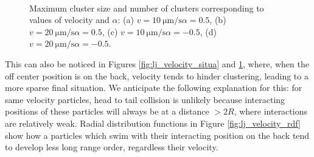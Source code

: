 \documentclass[../../master_thesis_np.tex]{subfiles}
\begin{document}
		\begin{figure}
			\centering
			\ContinuedFloat

			\\

			\caption{Maximum cluster size and number of clusters corresponding to values of velocity and $\alpha$: (a) $v = \SI{10}{\um \per \second} \alpha = 0.5$, (b) $v = \SI{20}{\um \per \second} \alpha = 0.5$, (c) $v = \SI{10}{\um \per \second} \alpha = -0.5$, (d) $v = \SI{20}{\um \per \second} \alpha = -0.5$.}
			\label{fig:lj_velocity_cluster}
		\end{figure}

		This can also be noticed in Figures \ref{fig:lj_velocity_situa} and \ref{fig:lj_velocity_cluster}, where, when the off center position is on the back, velocity tends to hinder clustering, leading to a more sparse final situation. 
		We anticipate the following explanation for this: for same velocity particles, head to tail collision is unlikely because interacting positions of these particles will always be at a distance $> 2R$, where interactions are relatively weak.
		Radial distribution functions in Figure \ref{fig:lj_velocity_rdf} show how a particles which swim with their interacting position on the back tend to develop less long range order, regardless their velocity.
		
\end{document}
